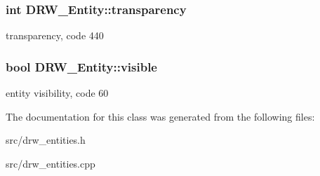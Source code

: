 \subsubsection[{transparency}]{\setlength{\rightskip}{0pt plus 5cm}int D\+R\+W\+\_\+\+Entity\+::transparency}\label{class_d_r_w___entity_a3706fb94037a61f8a4b705210b136117}
transparency, code 440 \hypertarget{class_d_r_w___entity_a410a134f3127298598a0075e60f3616d}{}
\subsubsection[{visible}]{\setlength{\rightskip}{0pt plus 5cm}bool D\+R\+W\+\_\+\+Entity\+::visible}\label{class_d_r_w___entity_a410a134f3127298598a0075e60f3616d}
entity visibility, code 60 

The documentation for this class was generated from the following files\+:\begin{DoxyCompactItemize}
\item 
src/drw\+\_\+entities.\+h\item 
src/drw\+\_\+entities.\+cpp\end{DoxyCompactItemize}
